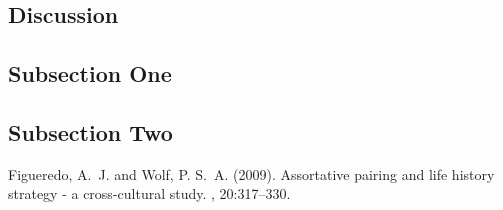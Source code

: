\documentclass[twoside]{article}
\begin{document}
\begin{multicols}{2}
\section{Discussion}
\subsection{Subsection One}
\lipsum[7] %
\subsection{Subsection Two}
\lipsum[8] %
\begin{thebibliography}{99} %
Figueredo, A.~J. and Wolf, P. S.~A. (2009).
\newblock Assortative pairing and life history strategy - a cross-cultural study.
, 20:317--330.
\end{thebibliography}
\end{multicols}
\end{document}
